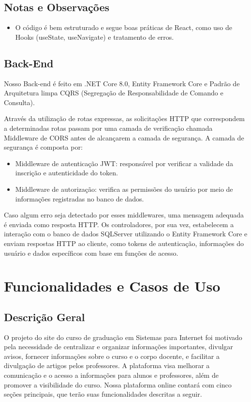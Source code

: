 \documentclass[a4paper,12pt]{report}
\begin{document}
\subsection{Notas e Observações} 
\begin{itemize} 
    \item O código é bem estruturado e segue boas práticas de React, como uso de Hooks (useState, useNavigate) e tratamento de erros. 
\end{itemize} 

\subsection{Back-End} 
Nosso Back-end é feito em .NET Core 8.0, Entity Framework Core e Padrão de Arquitetura limpa CQRS (Segregação de Responsabilidade de Comando e Consulta).
  
Através da utilização de rotas expressas, as solicitações HTTP que correspondem a determinadas rotas passam por uma camada de verificação chamada Middleware de CORS antes de alcançarem a camada de segurança. 
A camada de segurança é composta por: 
\begin{itemize} 
  \item Middleware de autenticação JWT: responsável por verificar a validade da inscrição e autenticidade do token. 
  \item Middleware de autorização: verifica as permissões do usuário por meio de informações registradas no banco de dados. 
\end{itemize} 
Caso algum erro seja detectado por esses middlewares, uma mensagem adequada é enviada como resposta HTTP. 
Os controladores, por sua vez, estabelecem a interação com o banco de dados SQLServer utilizando o Entity Framework Core e enviam respostas HTTP ao cliente, como tokens de autenticação, informações do usuário e dados específicos com base em funções de acesso. 

\section{Funcionalidades e Casos de Uso}
 \subsection{Descrição Geral}
    \label{sec:descricao}
O projeto do site do curso de graduação em Sistemas para Internet foi motivado pela necessidade de centralizar e organizar informações importantes, divulgar avisos, fornecer informações sobre o curso e o corpo docente, e facilitar a divulgação de artigos pelos professores. A plataforma visa melhorar a comunicação e o acesso a informações para alunos e professores, além de promover a visibilidade do curso.
Nossa plataforma online contará com cinco seções principais, que terão suas funcionalidades descritas a seguir.
 
\end{document}
